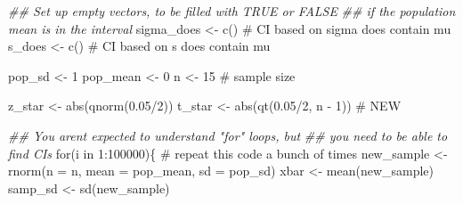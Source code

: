 \documentclass[
  letterpaper,
  DIV=11,
  numbers=noendperiod]{scrreprt}
\newenvironment{Shaded}{\begin{snugshade}}{\end{snugshade}}
\newcommand{\AttributeTok}[1]{\textcolor[rgb]{0.40,0.45,0.13}{#1}}
\newcommand{\CommentTok}[1]{\textcolor[rgb]{0.37,0.37,0.37}{#1}}
\newcommand{\ControlFlowTok}[1]{\textcolor[rgb]{0.00,0.23,0.31}{#1}}
\newcommand{\DecValTok}[1]{\textcolor[rgb]{0.68,0.00,0.00}{#1}}
\newcommand{\DocumentationTok}[1]{\textcolor[rgb]{0.37,0.37,0.37}{\textit{#1}}}
\newcommand{\FloatTok}[1]{\textcolor[rgb]{0.68,0.00,0.00}{#1}}
\newcommand{\FunctionTok}[1]{\textcolor[rgb]{0.28,0.35,0.67}{#1}}
\newcommand{\NormalTok}[1]{\textcolor[rgb]{0.00,0.23,0.31}{#1}}
\newcommand{\OtherTok}[1]{\textcolor[rgb]{0.00,0.23,0.31}{#1}}
\newcommand{\SpecialCharTok}[1]{\textcolor[rgb]{0.37,0.37,0.37}{#1}}
\begin{document}
\begin{Shaded}
\begin{Highlighting}[]
\DocumentationTok{\#\# Set up empty vectors, to be filled with TRUE or FALSE}
\DocumentationTok{\#\# if the population mean is in the interval}
\NormalTok{sigma\_does }\OtherTok{\textless{}{-}} \FunctionTok{c}\NormalTok{() }\CommentTok{\# CI based on sigma does contain mu}
\NormalTok{s\_does }\OtherTok{\textless{}{-}} \FunctionTok{c}\NormalTok{() }\CommentTok{\# CI based on s does contain mu}

\NormalTok{pop\_sd }\OtherTok{\textless{}{-}} \DecValTok{1}
\NormalTok{pop\_mean }\OtherTok{\textless{}{-}} \DecValTok{0}
\NormalTok{n }\OtherTok{\textless{}{-}} \DecValTok{15} \CommentTok{\# sample size}

\NormalTok{z\_star }\OtherTok{\textless{}{-}} \FunctionTok{abs}\NormalTok{(}\FunctionTok{qnorm}\NormalTok{(}\FloatTok{0.05}\SpecialCharTok{/}\DecValTok{2}\NormalTok{))}
\NormalTok{t\_star }\OtherTok{\textless{}{-}} \FunctionTok{abs}\NormalTok{(}\FunctionTok{qt}\NormalTok{(}\FloatTok{0.05}\SpecialCharTok{/}\DecValTok{2}\NormalTok{, n }\SpecialCharTok{{-}} \DecValTok{1}\NormalTok{)) }\CommentTok{\# NEW}

\DocumentationTok{\#\# You aren\textquotesingle{}t expected to understand "for" loops, but}
\DocumentationTok{\#\# you need to be able to find CIs}
\ControlFlowTok{for}\NormalTok{(i }\ControlFlowTok{in} \DecValTok{1}\SpecialCharTok{:}\DecValTok{100000}\NormalTok{)\{ }\CommentTok{\# repeat this code a bunch of times}
\NormalTok{    new\_sample }\OtherTok{\textless{}{-}} \FunctionTok{rnorm}\NormalTok{(}\AttributeTok{n =}\NormalTok{ n, }\AttributeTok{mean =}\NormalTok{ pop\_mean, }\AttributeTok{sd =}\NormalTok{ pop\_sd)}
\NormalTok{    xbar }\OtherTok{\textless{}{-}} \FunctionTok{mean}\NormalTok{(new\_sample)}
\NormalTok{    samp\_sd }\OtherTok{\textless{}{-}} \FunctionTok{sd}\NormalTok{(new\_sample)}


\end{Highlighting}
\end{Shaded}
\end{document}
